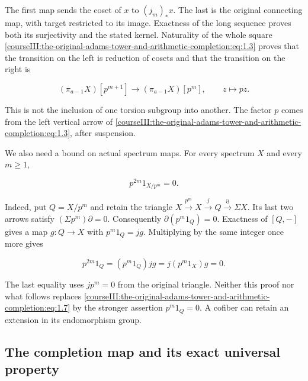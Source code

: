 The first map sends the coset of \(x\) to \((j_m)_*x\). The last is the original connecting map, with target restricted to its image. Exactness of the long sequence proves both its surjectivity and the stated kernel. Naturality of the whole square \eqref{courseIII:the-original-adams-tower-and-arithmetic-completion:eq:1.3} proves that the transition on the left is reduction of cosets and that the transition on the right is

\begin{equation}
(\pi_{a-1}X)[p^{m+1}]\longrightarrow(\pi_{a-1}X)[p^m],
\qquad z\longmapsto pz.
\label{courseIII:the-original-adams-tower-and-arithmetic-completion:eq:1.6}
\end{equation}

This is not the inclusion of one torsion subgroup into another. The factor \(p\) comes from the left vertical arrow of \eqref{courseIII:the-original-adams-tower-and-arithmetic-completion:eq:1.3}, after suspension.

We also need a bound on actual spectrum maps. For every spectrum \(X\) and every \(m\geq1\),

\begin{equation}
p^{2m}1_{X/p^m}=0.
\label{courseIII:the-original-adams-tower-and-arithmetic-completion:eq:1.7}
\end{equation}

Indeed, put \(Q=X/p^m\) and retain the triangle
\(X\xrightarrow{p^m}X\xrightarrow j Q\xrightarrow\partial\Sigma X\).
Its last two arrows satisfy \((\Sigma p^m)\partial=0\). Consequently
\(\partial(p^m1_Q)=0\). Exactness of \([Q,-]\) gives a map \(g:Q\to X\) with \(p^m1_Q=jg\). Multiplying by the same integer once more gives

\begin{equation}
p^{2m}1_Q=(p^m1_Q)jg=j(p^m1_X)g=0.
\label{courseIII:the-original-adams-tower-and-arithmetic-completion:eq:1.8}
\end{equation}

The last equality uses \(jp^m=0\) from the original triangle. Neither this proof nor what follows replaces \eqref{courseIII:the-original-adams-tower-and-arithmetic-completion:eq:1.7} by the stronger assertion \(p^m1_Q=0\). A cofiber can retain an extension in its endomorphism group.

\subsection{The completion map and its exact universal property}
\label{courseIII:the-original-adams-tower-and-arithmetic-completion:arithmetic-universal-map}

